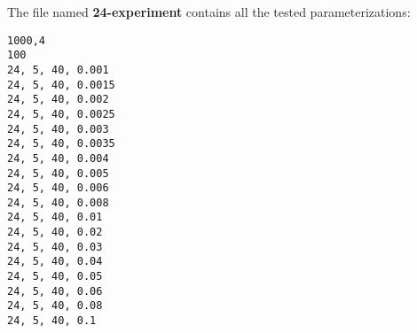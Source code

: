 \documentclass{article}
\begin{document}
The file named \textbf{24-experiment} contains all the tested parameterizations:

\begin{verbatim}
1000,4
100
24, 5, 40, 0.001
24, 5, 40, 0.0015
24, 5, 40, 0.002
24, 5, 40, 0.0025
24, 5, 40, 0.003
24, 5, 40, 0.0035
24, 5, 40, 0.004
24, 5, 40, 0.005
24, 5, 40, 0.006
24, 5, 40, 0.008
24, 5, 40, 0.01
24, 5, 40, 0.02
24, 5, 40, 0.03
24, 5, 40, 0.04
24, 5, 40, 0.05
24, 5, 40, 0.06
24, 5, 40, 0.08
24, 5, 40, 0.1
\end{verbatim}
\end{document}
